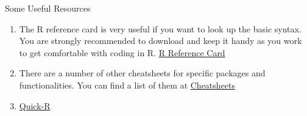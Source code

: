\documentclass[
  ignorenonframetext,
]{beamer}
\providecommand{\tightlist}{%
  \setlength{\itemsep}{0pt}\setlength{\parskip}{0pt}}
\begin{document}
\begin{frame}{Some Useful Resources}
\protect\hypertarget{some-useful-resources}{}
\begin{enumerate}
\tightlist
\item
  The R reference card is very useful if you want to look up the basic
  syntax. You are strongly recommended to download and keep it handy as
  you work to get comfortable with coding in R.
  \href{https://cran.r-project.org/doc/contrib/Short-refcard.pdf}{R
  Reference Card}
\item
  There are a number of other cheatsheets for specific packages and
  functionalities. You can find a list of them at
  \href{https://rstudio.com/resources/cheatsheets/\%3E}{Cheatsheets}\\
\item
  \href{https://www.statmethods.net/}{Quick-R}
\end{enumerate}
\end{frame}
\end{document}
